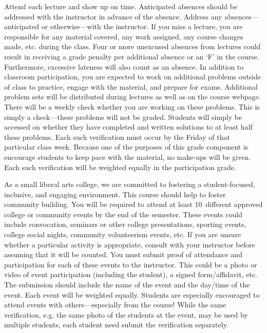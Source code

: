 \documentclass[11pt,letterpaper]{article}
\begin{document}
Attend each lecture and show up on time. Anticipated absences should be addressed with the instructor in advance of the absence. Address any absences---anticipated or otherwise---with the instructor. If you miss a lecture, you are responsible for any material covered, any work assigned, any course changes made, etc. during the class. Four or more unexcused absences from lectures could result in receiving a grade penalty per additional absence or an `F' in the course. Furthermore, excessive lateness will also count as an absence. In addition to classroom participation, you are expected to work on additional problems outside of class to practice, engage with the material, and prepare for exams. Additional problem sets will be distributed during lectures as well as on the course webpage. There will be a weekly check whether you are working on these problems. This is simply a check---these problems will not be graded. Students will simply be accessed on whether they have completed and written solutions to at least half these problems. Each such verification must occur by the Friday of that particular class week. Because one of the purposes of this grade component is encourage students to keep pace with the material, no make-ups will be given. Each such verification will be weighted equally in the participation grade. \pspace



As a small liberal arts college, we are committed to fostering a student-focused, inclusive, and engaging environment. This course should help to foster community building. You will be required to attend at least 10~different approved college or community events by the end of the semester. These events could include convocation, seminars or other college presentations, sporting events, college social nights, community volunteerism events, etc. If you are unsure whether a particular activity is appropriate, consult with your instructor before assuming that it will be counted. You must submit proof of attendance and participation for each of these events to the instructor. This could be a photo or video of event participation (including the student), a signed form/affidavit, etc. The submission should include the name of the event and the day/time of the event. Each event will be weighted equally. Students are especially encouraged to attend events with others---especially from the course! While the same verification, e.g. the same photo of the students at the event, may be used by multiple students, each student need submit the verification separately. \pspace
\end{document}

